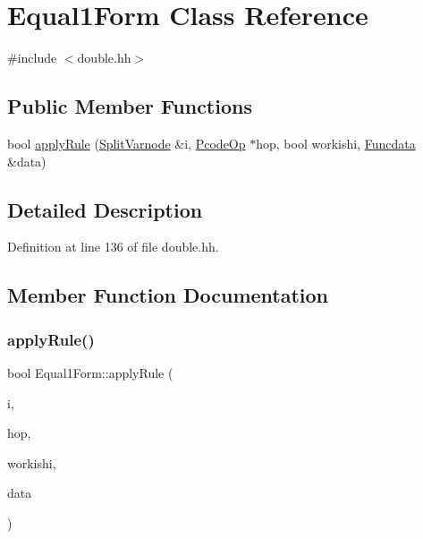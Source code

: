 \hypertarget{class_equal1_form}{}\section{Equal1\+Form Class Reference}
\label{class_equal1_form}


{\ttfamily \#include $<$double.\+hh$>$}

\subsection*{Public Member Functions}
\begin{DoxyCompactItemize}
\item 
bool \mbox{\hyperlink{class_equal1_form_aa1eb2fc408ca8a368e04baa798fc23e7}{apply\+Rule}} (\mbox{\hyperlink{class_split_varnode}{Split\+Varnode}} \&i, \mbox{\hyperlink{class_pcode_op}{Pcode\+Op}} $\ast$hop, bool workishi, \mbox{\hyperlink{class_funcdata}{Funcdata}} \&data)
\end{DoxyCompactItemize}


\subsection{Detailed Description}


Definition at line 136 of file double.\+hh.



\subsection{Member Function Documentation}
\mbox{\label{class_equal1_form_aa1eb2fc408ca8a368e04baa798fc23e7}} 
\subsubsection{\texorpdfstring{applyRule()}{applyRule()}}
{\footnotesize\ttfamily bool Equal1\+Form\+::apply\+Rule (\begin{DoxyParamCaption}\item[{\mbox{\hyperlink{class_split_varnode}{Split\+Varnode}} \&}]{i,  }\item[{\mbox{\hyperlink{class_pcode_op}{Pcode\+Op}} $\ast$}]{hop,  }\item[{bool}]{workishi,  }\item[{\mbox{\hyperlink{class_funcdata}{Funcdata}} \&}]{data }\end{DoxyParamCaption})}




